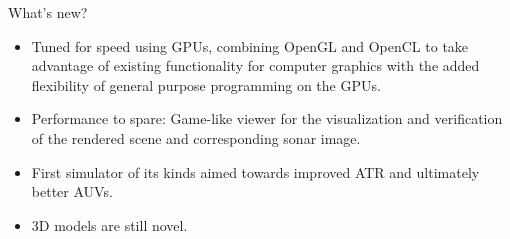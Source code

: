 What's new?
\begin{itemize}
\item Tuned for speed using GPUs, combining OpenGL and OpenCL to take advantage of existing functionality for computer graphics with the added flexibility of general purpose programming on the GPUs.
\item Performance to spare: Game-like viewer for the visualization and verification of the rendered scene and corresponding sonar image.
\item First simulator of its kinds aimed towards improved ATR and ultimately better AUVs.
\item 3D models are still novel. 
\end{itemize}